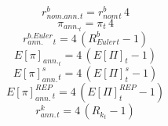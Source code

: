 \documentclass[10pt,a4paper]{article}
\begin{document}
\begin{dmath}
 r^b_{nom.ann.}_{t}= r^b_{nom}_{t}\, 4
\end{dmath}
\begin{dmath}
 \pi_{ann.} _{t}= \pi _{t}\, 4
\end{dmath}
\begin{dmath}
 r^{b.Euler}_{ann.} _{t}=4\, \left( R^b_{Euler} _{t}-1\right)
\end{dmath}
\begin{dmath}
 E[\pi]_{ann.} _{t}=4\, \left( E[\Pi] _{t}-1\right)
\end{dmath}
\begin{dmath}
 E[\pi]_{ann.}^{s} _{t}=4\, \left( E[\Pi]^{s} _{t}-1\right)
\end{dmath}
\begin{dmath}
 E[\pi]_{ann.}^{REP} _{t}=4\, \left( E[\Pi]^{REP} _{t}-1\right)
\end{dmath}
\begin{dmath}
 r^k_{ann.} _{t}=4\, \left( R_k _{t}-1\right)
\end{dmath}
\end{document}
